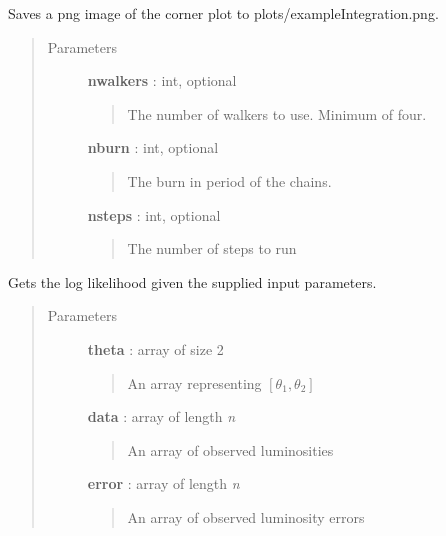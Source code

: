 \documentclass[letterpaper,10pt,english]{sphinxmanual}
\begin{document}
\begin{fulllineitems}
\begin{fulllineitems}
Saves a png image of the corner plot to plots/exampleIntegration.png.
\begin{quote}\begin{description}
\item[{Parameters}] \leavevmode
\textbf{nwalkers} : int, optional
\begin{quote}

The number of walkers to use. Minimum of four.
\end{quote}

\textbf{nburn} : int, optional
\begin{quote}

The burn in period of the chains.
\end{quote}

\textbf{nsteps} : int, optional
\begin{quote}

The number of steps to run
\end{quote}

\end{description}\end{quote}

\end{fulllineitems}


\begin{fulllineitems}
\label{dessn.simple:dessn.simple.exampleIntegral.ExampleIntegral.get_likelihood}
Gets the log likelihood given the supplied input parameters.
\begin{quote}\begin{description}
\item[{Parameters}] \leavevmode
\textbf{theta} : array of size 2
\begin{quote}

An array representing \([\theta_1,\theta_2]\)
\end{quote}

\textbf{data} : array of length \emph{n}
\begin{quote}

An array of observed luminosities
\end{quote}

\textbf{error} : array of length \emph{n}
\begin{quote}

An array of observed luminosity errors
\end{quote}


\end{description}
\end{quote}
\end{fulllineitems}
\end{fulllineitems}
\end{document}
